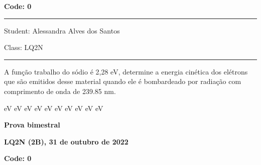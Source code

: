 \documentclass[12pt, addpoints]{exam}
\begin{document}
        \begin{minipage}[b]{0.20\linewidth}
            \begin{flushright}
                {\bf \large Code: 0}
            \end{flushright}
        \end{minipage}
        \vspace{0.5cm} \hrule \vspace{0.5cm}
        \begin{minipage}{0.75\linewidth}
            \begin{flushleft}
                Student: Alessandra Alves dos Santos
            \end{flushleft}
        \end{minipage}
        \begin{minipage}{0.20\linewidth}
            \begin{flushright}
                Class: LQ2N
            \end{flushright}
        \end{minipage}
        \vspace{0.5cm} \hrule \vspace{0.5cm}
        \begin{questions}
\begin{multicols*}{2}
\question A função trabalho do sódio é 2,28 eV, determine a energia cinética dos elétrons que são emitidos desse material quando ele é bombardeado por radiação com comprimento de onda de  239.85 nm.

\begin{oneparchoices}
 eV eV eV eV eV eV eV eV eV eV
\end{oneparchoices}\end{multicols*}
\end{questions}
\newpage
        \begin{minipage}[b]{0.75\linewidth}
            \begin{flushleft}
                {\bf \large Prova bimestral}
            \end{flushleft}
            \begin{flushleft}
                {\bf \large LQ2N (2B), 31 de outubro de 2022}
            \end{flushleft}
        \end{minipage}
        \begin{minipage}[b]{0.20\linewidth}
            \begin{flushright}
                {\bf \large Code: 0}
            \end{flushright}
        \end{minipage}
\end{document}

